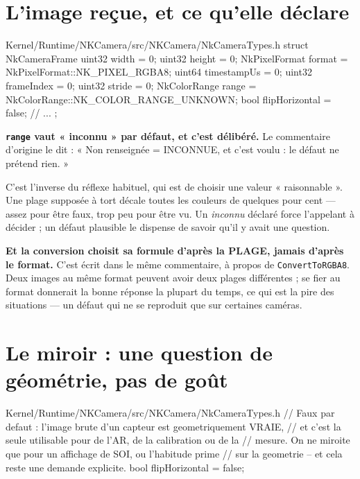\section{L'image reçue, et ce qu'elle déclare}

\begin{nkcode}{Kernel/Runtime/NKCamera/src/NKCamera/NkCameraTypes.h}
struct NkCameraFrame {
        uint32 width = 0;
        uint32 height = 0;
        NkPixelFormat format = NkPixelFormat::NK_PIXEL_RGBA8;
        uint64 timestampUs = 0;
        uint32 frameIndex = 0;
        uint32 stride = 0;
        NkColorRange range = NkColorRange::NK_COLOR_RANGE_UNKNOWN;
        bool flipHorizontal = false;
        // ...
};
\end{nkcode}

\begin{nkretenir}
\textbf{\texttt{range} vaut « inconnu » par défaut, et c'est délibéré.} Le
commentaire d'origine le dit : « Non renseignée = INCONNUE, et c'est voulu : le
défaut ne prétend rien. »

C'est l'inverse du réflexe habituel, qui est de choisir une valeur « raisonnable
». Une plage supposée à tort décale toutes les couleurs de quelques pour cent ---
assez pour être faux, trop peu pour être vu. Un \emph{inconnu} déclaré force
l'appelant à décider ; un défaut plausible le dispense de savoir qu'il y avait
une question.
\end{nkretenir}

\begin{nkretenir}
\textbf{Et la conversion choisit sa formule d'après la PLAGE, jamais d'après le
format.} C'est écrit dans le même commentaire, à propos de
\texttt{ConvertToRGBA8}. Deux images au même format peuvent avoir deux plages
différentes ; se fier au format donnerait la bonne réponse la plupart du temps,
ce qui est la pire des situations --- un défaut qui ne se reproduit que sur
certaines caméras.
\end{nkretenir}

\section{Le miroir : une question de géométrie, pas de goût}

\begin{nkcode}{Kernel/Runtime/NKCamera/src/NKCamera/NkCameraTypes.h}
// Faux par defaut : l'image brute d'un capteur est geometriquement VRAIE,
// et c'est la seule utilisable pour de l'AR, de la calibration ou de la
// mesure. On ne miroite que pour un affichage de SOI, ou l'habitude prime
// sur la geometrie -- et cela reste une demande explicite.
bool flipHorizontal = false;
\end{nkcode}

